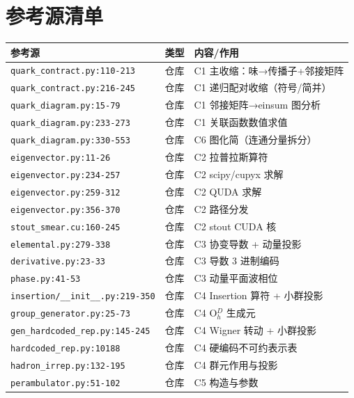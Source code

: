 \documentclass[UTF8]{ctexart}
\begin{document}
\section{参考源清单}
{\footnotesize\begin{xltabular}{\textwidth}{XlX}
\toprule
\textcolor{evidence}{参考源} & 类型 & 内容/作用 \\
\midrule
\endhead
\texttt{\nolinkurl{quark_contract.py:110-213}} & 仓库 & C1 主收缩：味→传播子+邻接矩阵 \\
\texttt{\nolinkurl{quark_contract.py:216-245}} & 仓库 & C1 递归配对收缩（符号/简并） \\
\texttt{\nolinkurl{quark_diagram.py:15-79}} & 仓库 & C1 邻接矩阵→einsum 图分析 \\
\texttt{\nolinkurl{quark_diagram.py:233-273}} & 仓库 & C1 关联函数数值求值 \\
\texttt{\nolinkurl{quark_diagram.py:330-553}} & 仓库 & C6 图化简（连通分量拆分） \\
\texttt{\nolinkurl{eigenvector.py:11-26}} & 仓库 & C2 拉普拉斯算符 \\
\texttt{\nolinkurl{eigenvector.py:234-257}} & 仓库 & C2 scipy/cupyx 求解 \\
\texttt{\nolinkurl{eigenvector.py:259-312}} & 仓库 & C2 QUDA 求解 \\
\texttt{\nolinkurl{eigenvector.py:356-370}} & 仓库 & C2 路径分发 \\
\texttt{\nolinkurl{stout_smear.cu:160-245}} & 仓库 & C2 stout CUDA 核 \\
\texttt{\nolinkurl{elemental.py:279-338}} & 仓库 & C3 协变导数 + 动量投影 \\
\texttt{\nolinkurl{derivative.py:23-33}} & 仓库 & C3 导数 3 进制编码 \\
\texttt{\nolinkurl{phase.py:41-53}} & 仓库 & C3 动量平面波相位 \\
\texttt{\nolinkurl{insertion/__init__.py:219-350}} & 仓库 & C4 Insertion 算符 + 小群投影 \\
\texttt{\nolinkurl{group_generator.py:25-73}} & 仓库 & C4 O$_h^D$ 生成元 \\
\texttt{\nolinkurl{gen_hardcoded_rep.py:145-245}} & 仓库 & C4 Wigner 转动 + 小群投影 \\
\texttt{\nolinkurl{hardcoded_rep.py:10188}} & 仓库 & C4 硬编码不可约表示表 \\
\texttt{\nolinkurl{hadron_irrep.py:132-195}} & 仓库 & C4 群元作用与投影 \\
\texttt{\nolinkurl{perambulator.py:51-102}} & 仓库 & C5 构造与参数 \\

\end{xltabular}}
\end{document}
